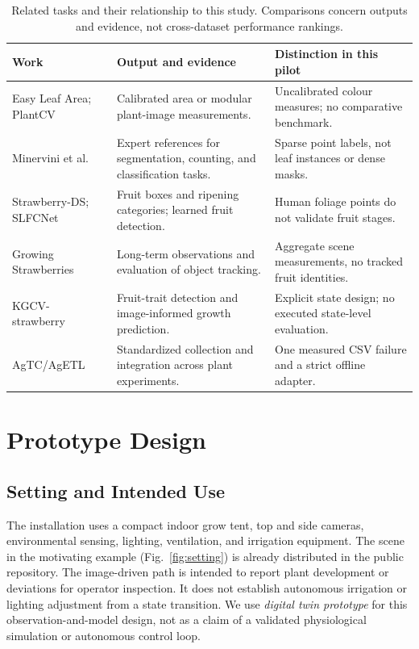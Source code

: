\documentclass[runningheads]{llncs}
\begin{document}
\begin{table}[t]
\caption{Related tasks and their relationship to this study. Comparisons concern outputs and evidence, not cross-dataset performance rankings.}
\label{tab:related}
\small
\begin{tabularx}{\linewidth}{@{}p{.23\linewidth}YY@{}}
\toprule
Work & Output and evidence & Distinction in this pilot\\
\midrule
Easy Leaf Area; PlantCV~\cite{easlon2014,gehan2017} & Calibrated area or modular plant-image measurements. & Uncalibrated colour measures; no comparative benchmark.\\
Minervini et al.~\cite{minervini2016} & Expert references for segmentation, counting, and classification tasks. & Sparse point labels, not leaf instances or dense masks.\\
Strawberry-DS; SLFCNet~\cite{elhariri2023,xu2025} & Fruit boxes and ripening categories; learned fruit detection. & Human foliage points do not validate fruit stages.\\
Growing Strawberries~\cite{wen2024} & Long-term observations and evaluation of object tracking. & Aggregate scene measurements, no tracked fruit identities.\\
KGCV-strawberry~\cite{yang2024} & Fruit-trait detection and image-informed growth prediction. & Explicit state design; no executed state-level evaluation.\\
AgTC/AgETL~\cite{vargasrojas2024} & Standardized collection and integration across plant experiments. & One measured CSV failure and a strict offline adapter.\\
\bottomrule
\end{tabularx}
\end{table}

\section{Prototype Design}
\label{sec:design}
\subsection{Setting and Intended Use}
The installation uses a compact indoor grow tent, top and side cameras, environmental sensing, lighting, ventilation, and irrigation equipment. The scene in the motivating example (Fig.~\ref{fig:setting}) is already distributed in the public repository. The image-driven path is intended to report plant development or deviations for operator inspection. It does not establish autonomous irrigation or lighting adjustment from a state transition. We use \emph{digital twin prototype} for this observation-and-model design, not as a claim of a validated physiological simulation or autonomous control loop.
\end{document}
